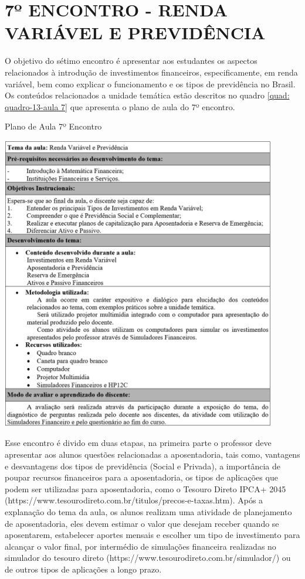 \section{7º ENCONTRO - RENDA VARIÁVEL E PREVIDÊNCIA}
O objetivo do sétimo encontro é apresentar aos estudantes os aspectos relacionados à introdução de investimentos financeiros, especificamente, em renda variável, bem como explicar o funcionamento e os tipos de previdência no Brasil. Os conteúdos relacionados a unidade temática estão descritos no quadro \ref{quad: quadro-13-aula 7} que apresenta o plano de aula do 7º encontro.
\graphicspath{{quadros/}} 
\begin{quadro}[!ht]
\centering
\begin{minipage}{0.8\textwidth}
\caption{Plano de Aula 7º Encontro}
\centering
\includegraphics[width=0.9\textwidth]{quadro-13-aula 7}
\label{quad: quadro-13-aula 7}
\end{minipage}
\end{quadro}

\newpage
Esse encontro é divido em duas etapas, na primeira parte o professor deve apresentar aos alunos questões relacionadas a aposentadoria, tais como, vantagens e desvantagens dos tipos de previdência (Social e Privada), a importância de poupar recursos financeiros para a aposentadoria, os tipos de aplicações que podem ser utilizadas para aposentadoria, como o Tesouro Direto IPCA+ 2045 (https://www.tesourodireto.com.br/titulos/precos-e-taxas.htm). Após a explanação do tema da aula, os alunos realizam uma atividade de planejamento de aposentadoria, eles devem estimar o valor que desejam receber quando se aposentarem, estabelecer aportes mensais e escolher um tipo de investimento para alcançar o valor final, por intermédio de simulações financeira realizadas no simulador do tesouro direto (https://www.tesourodireto.com.br/simulador/) ou de outros tipos de aplicações a longo prazo.

